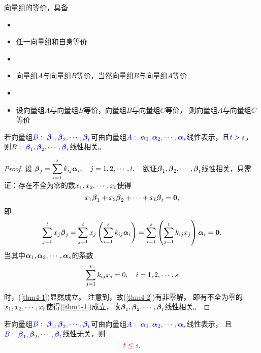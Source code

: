 \begin{frame}
向量组的等价，具备
\begin{itemize}
\item {}
\item[] 任一向量组和自身等价  
\item {}
\item[] 向量组$A$与向量组$B$等价，当然向量组$B$与向量组$A$等价  
\item {}
\item[] 设向量组$A$与向量组$B$等价，向量组$B$与向量组$C$等价，
  则向量组$A$与向量组$C$等价
\end{itemize} 
\end{frame}

\begin{frame}
\begin{dingli}
  若向量组$\textcolor{blue}{B:~\boldsymbol{\beta}_1,\boldsymbol{\beta}_2,\cdots,\boldsymbol{\beta}_t}$可由向量组$\textcolor{blue}{A:~\boldsymbol{\alpha}_1,\boldsymbol{\alpha}_2,\cdots,\boldsymbol{\alpha}_s}$线性表示，且$\textcolor{blue}{t>s}$，
  则$\textcolor{blue}{B:~\boldsymbol{\beta}_1,\boldsymbol{\beta}_2,\cdots,\boldsymbol{\beta}_t}$线性相关。
\end{dingli}
\pause 
\begin{proof}
设
$
\displaystyle \boldsymbol{\beta}_j=\sum_{i=1}^sk_{ij}\boldsymbol{\alpha}_i, \quad j=1,2,\cdots,t.~~
$  
欲证$\boldsymbol{\beta}_1,\boldsymbol{\beta}_2,\cdots,\boldsymbol{\beta}_t$线性相关，只需证：存在不全为零的数$x_1,x_2,\cdots,x_t$使得
\begin{equation}\label{thm4-1}
  x_1\betabd_1+x_2\betabd_2+\cd+x_t\betabd_t=\M0,
\end{equation}     
即
$$
\sum_{j=1}^t x_j \betabd_j = \sum_{j=1}^t x_j\left(\sum_{i=1}^sk_{ij}\alphabd_i\right)
= \sum_{i=1}^s\left(\sum_{j=1}^t k_{ij} x_j \right)  \alphabd_i = \M0.
$$  
当其中$\boldsymbol{\alpha}_1,\boldsymbol{\alpha}_2,\cdots,\boldsymbol{\alpha}_s$的系数
\begin{equation}\label{thm4-2}
  \sum_{j=1}^tk_{ij}x_j = 0, \quad i=1,2,\cdots,s
\end{equation}
时，(\ref{thm4-1})显然成立。 
注意到，故(\ref{thm4-2})有非零解。 即有不全为零的$x_1,x_2,\cdots,x_t$使得(\ref{thm4-1})成立，故$\boldsymbol{\beta}_1,\boldsymbol{\beta}_2,\cdots,\boldsymbol{\beta}_t$线性相关。
\end{proof}
\end{frame}

\begin{frame}
\begin{tuilun}
  若向量组$\textcolor{blue}{B:~\boldsymbol{\beta}_1,\boldsymbol{\beta}_2,\cdots,\boldsymbol{\beta}_t}$可由向量组$\textcolor{blue}{A:~\boldsymbol{\alpha}_1,\boldsymbol{\alpha}_2,\cdots,\boldsymbol{\alpha}_s}$线性表示，
  且$\textcolor{blue}{B:~\boldsymbol{\beta}_1,\boldsymbol{\beta}_2,\cdots,\boldsymbol{\beta}_t}$线性无关，则
  $$\textcolor{red}{t\le s}.$$
\end{tuilun}
\end{frame}

